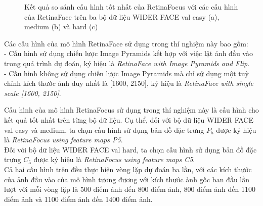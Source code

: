 {\begin{figure}[H]
        \caption{Kết quả so sánh cấu hình tốt nhất của RetinaFocus với các cấu hình của RetinaFace trên ba bộ dữ liệu WIDER FACE val easy (a), medium (b) và hard (c)}
        \label{fig:retinafocus_widerface_val_rtnf}
    \end{figure}
    
    \noindent
    Các cấu hình của mô hình RetinaFace sử dụng trong thí nghiệm này bao gồm: \\
    - Cấu hình sử dụng chiến lược Image Pyramids kết hợp với việc lật ảnh đầu vào trong quá trình dự đoán, ký hiệu là \textit{RetinaFace with Image Pyramids and Flip}. \\
    - Cấu hình không sử dụng chiến lược Image Pyramids mà chỉ sử dụng một tuỳ chỉnh kích thước ảnh duy nhất là [1600, 2150], ký hiệu là \textit{RetinaFace with single scale [1600, 2150]}.

    \noindent
    Cấu hình của mô hình RetinaFocus sử dụng trong thí nghiệm này là cấu hình cho kết quả tốt nhất trên từng bộ dữ liệu.
    Cụ thể, đối với bộ dữ liệu WIDER FACE val easy và medium, ta chọn cấu hình sử dụng bản đồ đặc trưng $P_5$ được ký hiệu là \textit{RetinaFocus using feature maps P5}. \\
    Đối với bộ dữ liệu WIDER FACE val hard, ta chọn cấu hình sử dụng bản đồ đặc trưng $C_5$ được ký hiệu là \textit{RetinaFocus using feature maps C5}. \\
    Cả hai cấu hình trên đều thực hiện vòng lặp dự đoán ba lần, với các kích thước của ảnh đầu vào của mô hình tương đương với kích thước ảnh gốc ban đầu lần lượt với mỗi vòng lặp là 500 điểm ảnh đến 800 điểm ảnh, 800 điểm ảnh đến 1100 điểm ảnh và 1100 điểm ảnh đến 1400 điểm ảnh.

}
